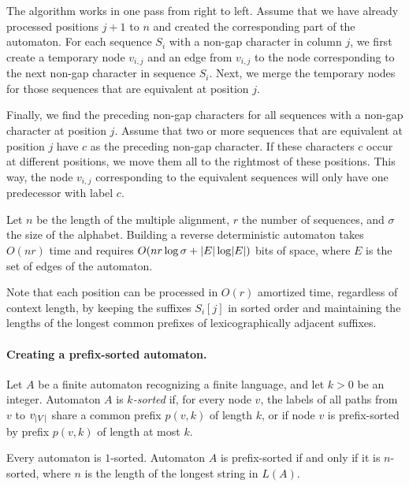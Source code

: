 The algorithm works in one pass from right to left. Assume that we have already processed positions $j+1$ to $n$ and created the corresponding part of the automaton. For each sequence $S_{i}$ with a non-gap character in column $j$, we first create a temporary node $v_{i,j}$ and an edge from $v_{i,j}$ to the node corresponding to the next non-gap character in sequence $S_{i}$. Next, we merge the temporary nodes for those sequences that are equivalent at position $j$.

Finally, we find the preceding non-gap characters for all sequences with a non-gap character at position $j$. Assume that two or more sequences that are equivalent at position $j$ have $c$ as the preceding non-gap character. If these characters $c$ occur at different positions, we move them all to the rightmost of these positions. This way, the node $v_{i,j}$ corresponding to the equivalent sequences will only have one predecessor with label $c$.

\begin{lemma}\label{lemma:automaton construction}
Let $n$ be the length of the multiple alignment, $r$ the number of sequences, and $\sigma$ the size of the alphabet. Building a reverse deterministic automaton takes $O(nr)$ time and requires $O(nr \log \sigma + \lvert E \rvert \log \lvert E \rvert)$ bits of space, where $E$ is the set of edges of the automaton.
\end{lemma}

Note that each position can be processed in $O(r)$ amortized time, regardless of context length, by keeping the suffixes $S_{i}[j]$ in sorted order and maintaining the lengths of the longest common prefixes of lexicographically adjacent suffixes.

\paragraph{Creating a prefix-sorted automaton.}

\begin{definition}
Let $A$ be a finite automaton recognizing a finite language, and let $k > 0$ be an integer. Automaton $A$ is {\em $k$\nobreakdash-sorted} if, for every node $v$, the labels of all paths from $v$ to $v_{\lvert V \rvert}$ share a common prefix $p(v, k)$ of length $k$, or if node $v$ is prefix-sorted by prefix $p(v, k)$ of length at most $k$.
\end{definition}

Every automaton is $1$\nobreakdash-sorted. Automaton $A$ is prefix-sorted if and only if it is $n$\nobreakdash-sorted, where $n$ is the length of the longest string in $L(A)$.

